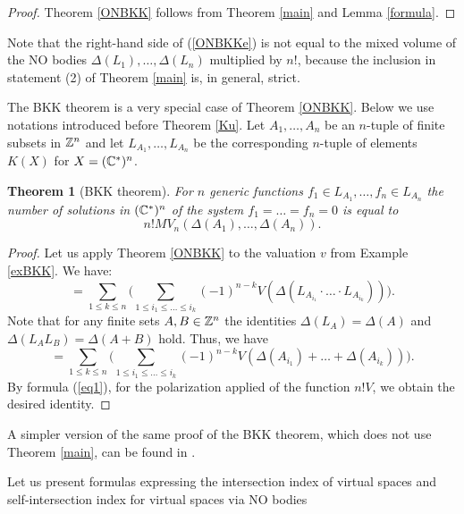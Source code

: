 \documentclass[11pt]{article}
\theoremstyle{plain}
\newtheorem{theorem}{Theorem}[section]
\theoremstyle{definition}
\begin{document}
\begin{proof} Theorem \ref{ONBKK} follows from Theorem \ref{main}  and Lemma \ref{formula}.
\end{proof}

Note that  the right-hand side of (\ref{ONBKKe}) is not equal to the  mixed volume of the NO bodies $\Delta(L_1), \dots, \Delta (L_n)$ multiplied by $n!$,  because the inclusion in statement (2) of Theorem \ref{main} is, in general, strict.

The  BKK theorem is a very special case of Theorem \ref{ONBKK}. Below we use notations introduced before Theorem \ref{Ku}.
Let $A_1,\dots,A_n$ be an $n$-tuple of finite  subsets in  $\Bbb Z^n$ and let $L_{A_1},\dots, L_{A_n}$ be the corresponding $n$-tuple of elements $K(X)$  for $X= (\Bbb C^*)^n$.

\begin{theorem}[BKK theorem]\label{BKK} For $n$ generic functions $f_1\in L_{A_1},\dots,f_n\in L_{A_n}$ the number of solutions in $(\Bbb C^*)^n$ of the system $f_1=\dots=f_n=0$ is equal to \begin{equation*}n!M V_n(\Delta(A_1),\dots, \Delta(A_n)).\end{equation*}
\end{theorem}


\begin{proof} Let us apply Theorem \ref{ONBKK} to the valuation $v$ from Example \ref{exBKK}.  We have:
\begin{equation*}[L_{A_1},\dots, L_{A_n}]= \sum _{1\leq k\leq n} \Bigg( \sum _{1\leq i_1\leq \dots \leq  i_k} (-1)^{n-k} V(\Delta (L_{A_{i_1}}\cdot \ldots\cdot L_{A_{i_k}}))\Bigg).\end{equation*}
Note that for any   finite sets $A,B\in \Bbb Z^n$ the identities  $\Delta(L_A)=\Delta(A)$ and $\Delta (L_A L_B)=\Delta(A+B)$ hold. Thus, we have
\begin{equation*}
[L_{A_1},\dots, L_{A_n}]=\sum _{1\leq k\leq n} \Bigg( \sum _{1\leq i_1\leq \dots \leq  i_k} (-1)^{n-k} V(\Delta (A_{i_1})+\dots+\Delta(A_{i_k}))\Bigg).\end{equation*}
By formula (\ref{eq1}), for the polarization applied of the function $n!V$, we obtain the desired identity.
\end{proof}

A simpler version of the same proof of the BKK theorem, which does not use Theorem \ref{main}, can be found in   \cite{Kh92}.

Let us present   formulas expressing the intersection index of virtual spaces and self-intersection index for virtual spaces via NO bodies
\end{document}
